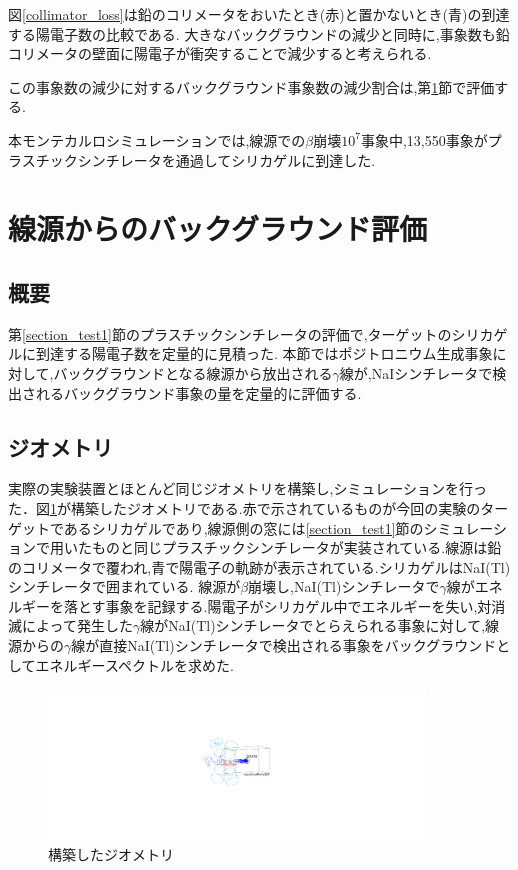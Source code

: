 図\ref{collimator_loss}は鉛のコリメータをおいたとき(赤)と置かないとき(青)の到達する陽電子数の比較である.
大きなバックグラウンドの減少と同時に,事象数も鉛コリメータの壁面に陽電子が衝突することで減少すると考えられる.

この事象数の減少に対するバックグラウンド事象数の減少割合は,第\ref{section_test2}節で評価する.

本モンテカルロシミュレーションでは,線源での$\beta$崩壊$10^7$事象中,13,550事象がプラスチックシンチレータを通過してシリカゲルに到達した.



\section{線源からのバックグラウンド評価}
\label{section_test2}

\subsection{概要}
第\ref{section_test1}節のプラスチックシンチレータの評価で,ターゲットのシリカゲルに到達する陽電子数を定量的に見積った.
本節ではポジトロニウム生成事象に対して,バックグラウンドとなる線源から放出される$\gamma$線が,NaIシンチレータで検出されるバックグラウンド事象の量を定量的に評価する.


\subsection{ジオメトリ}
実際の実験装置とほとんど同じジオメトリを構築し,シミュレーションを行った．図\ref{test2_geometry}が構築したジオメトリである.赤で示されているものが今回の実験のターゲットであるシリカゲルであり,線源側の窓には\ref{section_test1}節のシミュレーションで用いたものと同じプラスチックシンチレータが実装されている.線源は鉛のコリメータで覆われ,青で陽電子の軌跡が表示されている.シリカゲルはNaI(Tl)シンチレータで囲まれている.
線源が$\beta$崩壊し,NaI(Tl)シンチレータで$\gamma$線がエネルギーを落とす事象を記録する.陽電子がシリカゲル中でエネルギーを失い,対消滅によって発生した$\gamma$線がNaI(Tl)シンチレータでとらえられる事象に対して,線源からの$\gamma$線が直接NaI(Tl)シンチレータで検出される事象をバックグラウンドとしてエネルギースペクトルを求めた.

\begin{figure}[htbp]
	\centering
		\includegraphics[width=10cm]{img/test2_geometry.pdf}
	\caption{構築したジオメトリ}
	\label{test2_geometry}
\end{figure}

